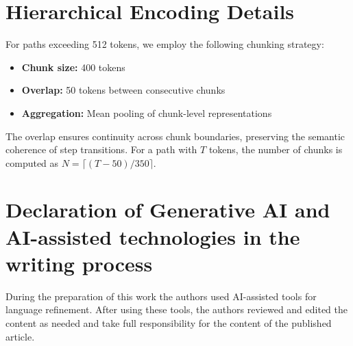 \documentclass[a4paper,fleqn]{cas-dc}
\begin{document}
\section{Hierarchical Encoding Details}
\label{sec:hierarchical-details}

For paths exceeding 512 tokens, we employ the following chunking strategy:

\begin{itemize}
    \item \textbf{Chunk size:} 400 tokens
    \item \textbf{Overlap:} 50 tokens between consecutive chunks
    \item \textbf{Aggregation:} Mean pooling of chunk-level representations
\end{itemize}

The overlap ensures continuity across chunk boundaries, preserving the semantic coherence of step transitions. For a path with $T$ tokens, the number of chunks is computed as $N = \lceil (T - 50) / 350 \rceil$.

\section*{Declaration of Generative AI and AI-assisted technologies in the writing process}

During the preparation of this work the authors used AI-assisted tools for language refinement. After using these tools, the authors reviewed and edited the content as needed and take full responsibility for the content of the published article.

\printcredits



\end{document}
